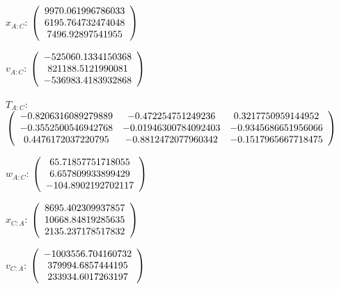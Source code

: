 \begin{description}
$x_{A:C}$: $\left( \begin{array} {ccc} 9970.061996786033 \\     6195.764732474048 \\      7496.92897541955
\end{array} \right)\\ \\$

$v_{A:C}$:  $\left( \begin{array} {ccc}  -525060.1334150368 \\     821188.5121990081 \\    -536983.4183932868
\end{array} \right)\\ \\$

$T_{A:C}$: $\left( \begin{array} {ccc}
 -0.8206316089279889 &    -0.472254751249236 &    0.3217750959144952 \\
  -0.3552500546942768 &  -0.01946300784092403 &   -0.9345686651956066 \\
  0.4476172037220795 &   -0.8812472077960342 &   -0.1517965667718475 \\
\end{array} \right)\\ \\$

$w_{A:C}$:  $\left( \begin{array} {ccc}  65.71857751718055 \\     6.657809933899429 \\    -104.8902192702117
\end{array} \right)\\ \\$

$x_{C:A}$: $\left( \begin{array} {ccc} 8695.402309937857 \\     10668.84819285635 \\     2135.237178517832
\end{array} \right)\\ \\$

$v_{C:A}$:  $\left( \begin{array} {ccc} -1003556.704160732 \\     379994.6857444195 \\     233934.6017263197
\end{array} \right)\\ \\$


\end{description}
